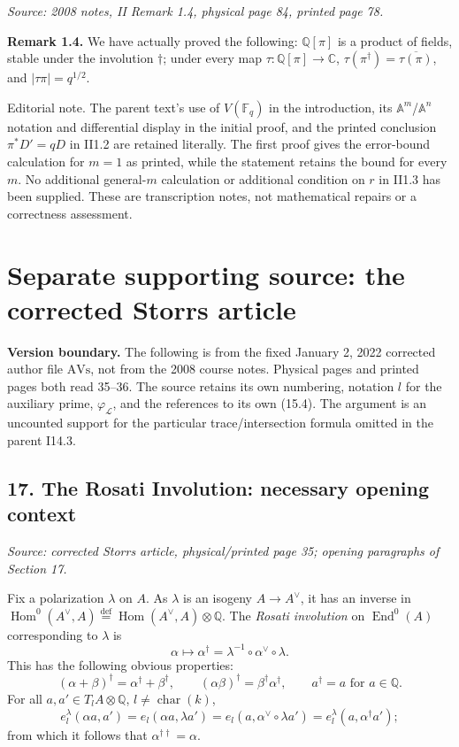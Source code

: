\documentclass[11pt]{article}
\DeclareMathOperator{\AVEnd}{End}
\DeclareMathOperator{\AVHom}{Hom}
\newcommand{\AVQ}{\mathbb{Q}}
\newcommand{\AVC}{\mathbb{C}}
\newcommand{\AVF}{\mathbb{F}}
\newcommand{\AVA}{\mathbb{A}}
\newcommand{\AVsrc}[1]{\par\smallskip\noindent\textit{Source: #1.}\par\smallskip}
\newcommand{\AVeditorial}[1]{\par\smallskip\noindent\textsf{Editorial note.} #1\par\smallskip}
\begin{document}
\AVsrc{2008 notes, II Remark 1.4, physical page 84, printed page 78}
\noindent\textbf{Remark 1.4.}
We have actually proved the following: $\AVQ[\pi]$ is a product of
fields, stable under the involution $\dagger$; under every map
$\tau:\AVQ[\pi]\to\AVC$, $\tau(\pi^{\dagger})=\overline{\tau(\pi)}$,
and $\lvert\tau\pi\rvert=q^{1/2}$.

\AVeditorial{The parent text's use of $V(\AVF_q)$ in the introduction,
its $\AVA^m$/$\AVA^n$ notation and differential display in the initial
proof, and the printed conclusion $\pi^*D'=qD$ in II1.2 are retained
literally. The first proof gives the error-bound calculation for $m=1$
as printed, while the statement retains the bound for every $m$.
No additional general-$m$ calculation or additional condition on $r$ in
II1.3 has been supplied. These are transcription notes, not mathematical
repairs or a correctness assessment.}

\section*{Separate supporting source: the corrected Storrs article}
\noindent\textbf{Version boundary.}
The following is from the fixed January 2, 2022 corrected author file
$\mathrm{AVs}$, not from the 2008 course notes. Physical pages and printed
pages both read 35--36. The source retains its own numbering, notation
$l$ for the auxiliary prime, $\varphi_{\mathcal L}$, and the references
to its own (15.4). The argument is an uncounted support for the particular
trace/intersection formula omitted in the parent I14.3.

\subsection*{17. The Rosati Involution: necessary opening context}
\AVsrc{corrected Storrs article, physical/printed page 35; opening paragraphs of Section 17}
Fix a polarization $\lambda$ on $A$. As $\lambda$ is an isogeny
$A\to A^{\vee}$, it has an inverse in
$\AVHom^0(A^{\vee},A)\overset{\mathrm{def}}=
\AVHom(A^{\vee},A)\otimes\AVQ$.
The \emph{Rosati involution} on $\AVEnd^0(A)$ corresponding to
$\lambda$ is
\[
\alpha\longmapsto\alpha^{\dagger}
=\lambda^{-1}\circ\alpha^{\vee}\circ\lambda.
\]
This has the following obvious properties:
\[
(\alpha+\beta)^{\dagger}=\alpha^{\dagger}+\beta^{\dagger},\qquad
(\alpha\beta)^{\dagger}=\beta^{\dagger}\alpha^{\dagger},\qquad
a^{\dagger}=a\text{ for }a\in\AVQ.
\]
For all $a,a'\in T_l A\otimes\AVQ$, $l\ne\operatorname{char}(k)$,
\[
e_l^{\lambda}(\alpha a,a')
=e_l(\alpha a,\lambda a')
=e_l(a,\alpha^{\vee}\circ\lambda a')
=e_l^{\lambda}(a,\alpha^{\dagger}a');
\]
from which it follows that $\alpha^{\dagger\dagger}=\alpha$.
\end{document}

